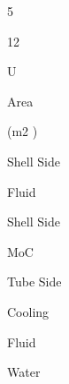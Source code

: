 \documentclass[a4paper,portrait,12pt]{article}
\begin{document}
5





12





\begin{flushleft}
U
\end{flushleft}





\begin{flushleft}
Area
\end{flushleft}





\begin{flushleft}
(m2 )
\end{flushleft}





\begin{flushleft}
Shell Side
\end{flushleft}


\begin{flushleft}
Fluid
\end{flushleft}


\begin{flushleft}
Shell Side
\end{flushleft}


\begin{flushleft}
MoC
\end{flushleft}


\begin{flushleft}
Tube Side
\end{flushleft}





\begin{flushleft}
Cooling
\end{flushleft}





\begin{flushleft}
Fluid
\end{flushleft}





\begin{flushleft}
Water
\end{flushleft}
\end{document}
